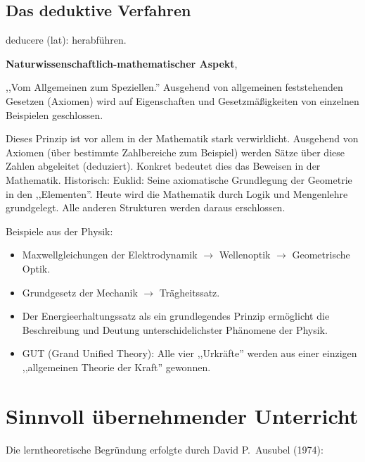 \subsection{Das deduktive Verfahren}

deducere (lat): herabf\"{u}hren.

\mip
{\bf Naturwissenschaftlich-mathematischer Aspekt},

,,Vom Allgemeinen zum Speziellen.''
Ausgehend von allgemeinen feststehenden Gesetzen (Axiomen)
wird auf Eigenschaften und Gesetzm\"{a}{\ss}igkeiten von einzelnen
Beispielen geschlossen.

\bip
Dieses Prinzip ist vor allem in der Mathematik stark verwirklicht.
Ausgehend von Axiomen (\"{u}ber bestimmte Zahlbereiche zum Beispiel)
werden S\"{a}tze \"{u}ber diese Zahlen abgeleitet (deduziert).
Konkret bedeutet dies das Beweisen in der Mathematik.
\mip
Historisch: Euklid: Seine axiomatische Grundlegung der Geometrie in den
,,Elementen''.
\mip
Heute wird die Mathematik durch Logik und Mengenlehre grundgelegt.
Alle anderen Strukturen werden daraus erschlossen.

Beispiele aus der Physik:
\begin{itemize}
\item Maxwellgleichungen der Elektrodynamik
             $\to$ Wellenoptik $\to$ Geometrische Optik.
\item Grundgesetz der Mechanik $\to$ Tr\"{a}gheitssatz.
\item Der Energieerhaltungssatz als ein grundlegendes Prinzip erm\"{o}glicht
die Beschreibung und Deutung unterschidelichster Ph\"{a}nomene der Physik.
\item GUT (Grand Unified Theory):
Alle vier ,,Urkr\"{a}fte'' werden aus einer
einzigen ,,allgemeinen Theorie der Kraft'' gewonnen.
\end{itemize}

\bip\bip
\section{Sinnvoll \"{u}bernehmender Unterricht}

Die lerntheoretische Begr\"{u}ndung erfolgte durch
David P.\ Ausubel (1974):

